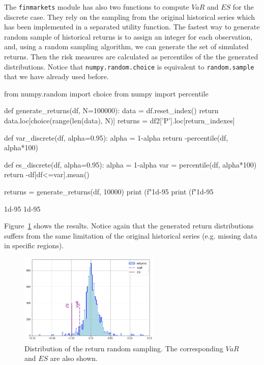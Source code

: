 \begin{finmarkets}
The \texttt{finmarkets} module has also two functions to compute $VaR$ and $ES$ for the discrete case. 
They rely on the sampling from the original historical series which has been implemented in a separated utility function. The fastest way to generate random sample of historical returns is to assign an integer for each observation, and, using a random sampling algorithm, we can generate the set of simulated returns. Then the risk measures are calculated as percentiles of the the generated distributions. Notice that \texttt{numpy.random.choice} is equivalent to \texttt{random.sample} that we have already used before.
\end{finmarkets}

\begin{ipython}
from numpy.random import choice
from numpy import percentile

def generate_returns(df, N=100000):
    data = df.reset_index()
    return data.loc[choice(range(len(data), N)]
    returns = df2['P'].loc[return_indexes]

def var_discrete(df, alpha=0.95):
    alpha = 1-alpha
    return -percentile(df, alpha*100)
    
def es_discrete(df, alpha=0.95):
    alpha = 1-alpha
    var = percentile(df, alpha*100)	
    return -df[df<=var].mean()
    
returns = generate_returns(df, 10000)
print (f"1d-95%
print (f"1d-95%
\end{ipython}
\begin{ioutput}
1d-95%
1d-95%
\end{ioutput}

Figure~\ref{fig:historical_var} shows the results. Notice again that the generated return distributions suffers from the same limitation of the original historical series (e.g. missing data in specific regions).

\begin{figure}[htb]
\centering
\includegraphics[width=0.6\textwidth]{figures/historical_var}
\caption{Distribution of the return random sampling. The corresponding $VaR$ and $ES$ are also shown.}
\label{fig:historical_var}
\end{figure}

